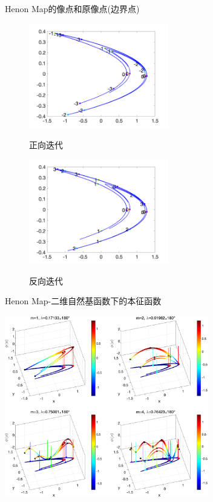 \documentclass{beamer}
\begin{document}
	\begin{frame}{Henon Map的像点和原像点(边界点)}
		\begin{figure}
			\begin{minipage}{0.45\linewidth}
				\centerline{\includegraphics[width=2.4in]{images/Henon_boundary_forward.png}}
				\centerline{正向迭代}
			\end{minipage}
			\hfill
			\begin{minipage}{0.45\linewidth}
				\centerline{\includegraphics[width=2.4in]{images/Henon_boundary_reverse.png}}
				\centerline{反向迭代}
			\end{minipage}
		\end{figure}
	\end{frame}
	\begin{frame}{Henon Map-二维自然基函数下的本征函数}
		\centerline{\includegraphics[width=3.5in]{images/11-Henon_eigen_natural_attr_n10000m1-2-3-4.eps}}
	\end{frame}
\end{document}
